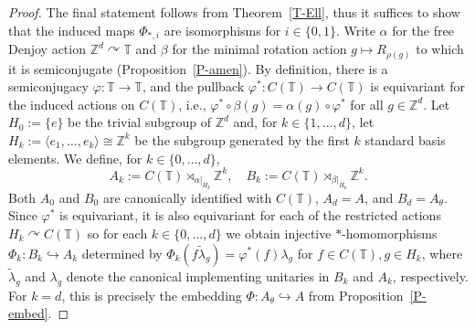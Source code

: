 \documentclass[11pt,a4paper,leqno]{amsart}
\theoremstyle{definition}
\theoremstyle{remark}
\numberwithin{equation}{section}
\theoremstyle{plain}
\newcommand{\Zb}{\mathbb{Z}}
\newcommand{\Tb}{\mathbb{T}}
\begin{document}
\begin{proof}
	The final statement follows from Theorem~\ref{T-Ell}, thus it suffices to show that the induced maps $\Phi_{*,i}$ are isomorphisms for $i \in \{0,1\}$. Write $\alpha$ for the free Denjoy action $\Zb^d \curvearrowright \Tb$ and $\beta$ for the minimal rotation action $g\mapsto R_{\rho(g)}$ to which it is semiconjugate (Proposition~\ref{P-amen}). By definition, there is a semiconjugacy $\varphi : \Tb \to \Tb$, and the pullback $\varphi^* : C(\Tb) \to C(\Tb)$ is equivariant for the induced actions on $C(\Tb)$, i.e., $\varphi^* \circ \beta(g) = \alpha(g) \circ \varphi^*$ for all $g\in \Zb^d$. Let $H_0 := \{e\}$ be the trivial subgroup of $\Zb^d$ and, for $k \in \{1,\ldots,d\}$, let $H_k := \langle e_1,\ldots,e_k\rangle \cong \Zb^k$ be the subgroup generated by the first $k$ standard basis elements. We define, for $k\in \{0,\ldots,d\}$,
	\begin{equation}
		A_k := C(\Tb) \rtimes_{\alpha|_{H_k}} \Zb^k, \quad B_k := C(\Tb) \rtimes_{\beta|_{H_k}} \Zb^k.
	\end{equation}
Both $A_0$ and $B_0$ are canonically identified with $C(\Tb)$, $A_d = A$, and $B_d = A_\theta$. Since $\varphi^*$ is equivariant, it is also equivariant for each of the restricted actions $H_k \curvearrowright C(\Tb)$ so for each $k\in \{0,\ldots,d\}$ we obtain injective $*$-homomorphisms $\Phi_k : B_k \hookrightarrow A_k$ determined by $\Phi_k(f\tilde{\lambda}_g) = \varphi^*(f)\lambda_g$ for $f\in C(\Tb), g\in H_k$, where $\tilde{\lambda}_g$ and $\lambda_g$ denote the canonical implementing unitaries in $B_k$ and $A_k$, respectively. For $k = d$, this is precisely the embedding $\Phi : A_\theta\hookrightarrow A$ from Proposition~\ref{P-embed}.   
	

\end{proof}
\end{document}
